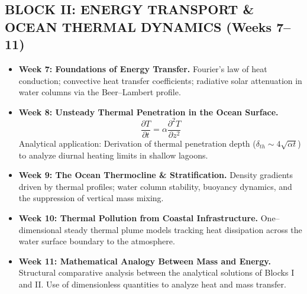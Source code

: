 \subsection{BLOCK II: ENERGY TRANSPORT \& OCEAN THERMAL DYNAMICS (Weeks 7–11)}
\begin{itemize}
    \item \textbf{Week 7: Foundations of Energy Transfer.} Fourier's law of heat conduction; convective heat transfer coefficients; radiative solar attenuation in water columns via the Beer--Lambert profile.
    \item \textbf{Week 8: Unsteady Thermal Penetration in the Ocean Surface.}
    \begin{equation*}
        \frac{\partial T}{\partial t} = \alpha \frac{\partial^2 T}{\partial z^2}
    \end{equation*}
    Analytical application: Derivation of thermal penetration depth ($\delta_{th} \sim 4\sqrt{\alpha t}$) to analyze diurnal heating limits in shallow lagoons.
    \item \textbf{Week 9: The Ocean Thermocline \& Stratification.} Density gradients driven by thermal profiles; water column stability, buoyancy dynamics, and the suppression of vertical mass mixing.
    \item \textbf{Week 10: Thermal Pollution from Coastal Infrastructure.} One--dimensional steady thermal plume models tracking heat dissipation across the water surface boundary to the atmosphere.
    \item \textbf{Week 11: Mathematical Analogy Between Mass and Energy.} Structural comparative analysis between the analytical solutions of Blocks I and II. Use of dimensionless quantities to analyze heat and mass transfer.
\end{itemize}


